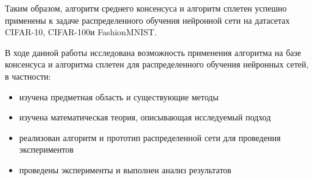 \documentclass[a4paper,article,14pt]{extarticle}
\begin{document}
Таким образом, алгоритм среднего консенсуса и алгоритм сплетен успешно применены к задаче распределенного обучения нейронной сети на датасетах \flqq CIFAR-10\frqq, \flqq CIFAR-100\frqq\space и \flqq FashionMNIST\frqq.

\pagebreak
{}
В ходе данной работы исследована возможность применения алгоритма на базе консенсуса и алгоритма сплетен для распределенного обучения нейронных сетей, в частности:

\begin{itemize}
  \item изучена предметная область и существующие методы
  \item изучена математическая теория, описывающая исследуемый подход
  \item реализован алгоритм и прототип распределенной сети для проведения экспериментов
  \item проведены эксперименты и выполнен анализ результатов
\end{itemize}
\pagebreak
\end{document}
